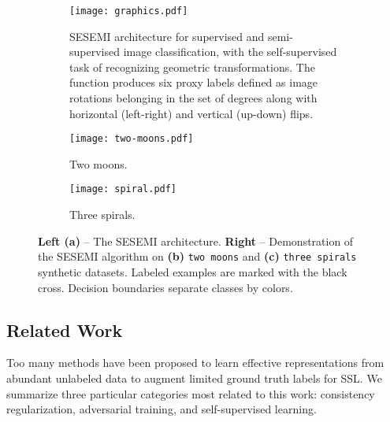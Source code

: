 \documentclass{article}
\begin{document}
\begin{figure}[t]
    \centering
    \begin{minipage}{0.6\textwidth}
        \begin{subfigure}[t]{1.23\textwidth}
            \centering
            \texttt{[image: graphics.pdf]}
            \caption{SESEMI architecture for supervised and semi-supervised image classification, with the self-supervised task of recognizing geometric transformations. The function  produces six proxy labels defined as image rotations belonging in the set of  degrees along with horizontal (left-right) and vertical (up-down) flips.}
            \label{figure1a}
        \end{subfigure}
    \end{minipage}\begin{minipage}{0.8\textwidth}
        \begin{subfigure}[t]{0.7\textwidth}
            \centering
            \texttt{[image: two-moons.pdf]}
            \caption{Two moons.}
            \label{figure1b}
        \end{subfigure}
\begin{subfigure}[t]{0.705\textwidth}
            \centering
            \texttt{[image: spiral.pdf]}
            \caption{Three spirals.}
            \label{figure1c}
        \end{subfigure}
    \end{minipage}\caption{\textbf{Left (a)} -- The SESEMI architecture. \textbf{Right} -- Demonstration of the SESEMI algorithm on \textbf{(b)} \texttt{two moons} and \textbf{(c)} \texttt{three spirals} synthetic datasets. Labeled examples are marked with the black cross. Decision boundaries separate classes by colors.}
    \label{figure1}
\end{figure}

\subsection{Related Work}
Too many methods have been proposed to learn effective representations from abundant unlabeled data to augment limited ground truth labels for SSL. We summarize three particular categories most related to this work: consistency regularization, adversarial training, and self-supervised learning.
\end{document}
